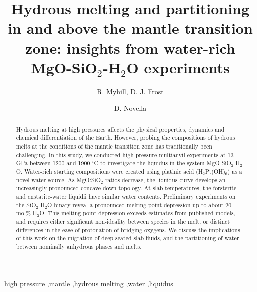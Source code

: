\documentclass[review]{elsarticle}
\begin{document}
\begin{frontmatter}

\title{Hydrous melting and partitioning in and above the mantle transition zone: insights from water-rich MgO-SiO$_2$-H$_2$O experiments}

\author{R. Myhill, D. J. Frost}
\address{Bayerisches Geoinstitut, Universit\"{a}t Bayreuth, Universit\"{a}tsstrasse 30, 95447 Bayreuth, Germany}

\author{D. Novella}
\address{Laboratoire Magmas et Volcans, Universit\'{e} Blaise Pascal, 5 Rue Kessler, 63038 Clermond-Ferrand, France}




\begin{abstract}
Hydrous melting at high pressures affects the physical properties, dynamics and chemical differentiation of the Earth. However, probing the compositions of hydrous melts at the conditions of the mantle transition zone has traditionally been challenging. In this study, we conducted high pressure multianvil experiments at 13 GPa between 1200 and 1900 $^{\circ}$C to investigate the liquidus in the system MgO-SiO$_2$-H$_2$O. Water-rich starting compositions were created using platinic acid (H$_2$Pt(OH)$_6$) as a novel water source. As MgO:SiO$_2$ ratios decrease, the liquidus curve develops an increasingly pronounced concave-down topology. At slab temperatures, the forsterite- and enstatite-water liquidii have similar water contents. Preliminary experiments on the SiO$_2$-H$_2$O binary reveal a pronounced melting point depression up to about 20 mol\% H$_2$O. This melting point depression exceeds estimates from published models, and requires either significant non-ideality between species in the melt, or distinct differences in the ease of protonation of bridging oxygens. We discuss the implications of this work on the migration of deep-seated slab fluids, and the partitioning of water between nominally anhydrous phases and melts.
\end{abstract}

\begin{keyword}
high pressure \sep mantle \sep hydrous melting \sep water \sep liquidus
\end{keyword}

\end{frontmatter}
\end{document}
